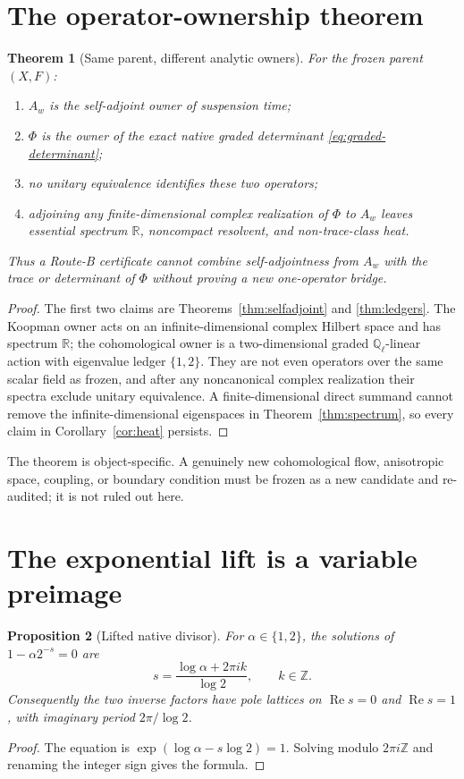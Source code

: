 \documentclass[11pt]{article}
\newtheorem{theorem}{Theorem}
\newtheorem{proposition}[theorem]{Proposition}
\theoremstyle{remark}\newtheorem{remark}[theorem]{Remark}
\newcommand{\R}{\mathbb R}
\newcommand{\Q}{\mathbb Q}
\newcommand{\Z}{\mathbb Z}
\begin{document}
\section{The operator-ownership theorem}

\begin{theorem}[Same parent, different analytic owners]\label{thm:owner}
For the frozen parent \((X,F)\):
\begin{enumerate}[label=(\roman*)]
\item \(A_w\) is the self-adjoint owner of suspension time;
\item \(\Phi\) is the owner of the exact native graded determinant
      \eqref{eq:graded-determinant};
\item no unitary equivalence identifies these two operators;
\item adjoining any finite-dimensional complex realization of \(\Phi\) to
      \(A_w\) leaves essential spectrum \(\R\), noncompact resolvent, and
      non-trace-class heat.
\end{enumerate}
Thus a Route-B certificate cannot combine self-adjointness from \(A_w\) with
the trace or determinant of \(\Phi\) without proving a new one-operator
bridge.
\end{theorem}
\begin{proof}
The first two claims are Theorems~\ref{thm:selfadjoint} and
\ref{thm:ledgers}.  The Koopman owner acts on an infinite-dimensional complex
Hilbert space and has spectrum \(\R\); the cohomological owner is a
two-dimensional graded \(\Q_\ell\)-linear action with eigenvalue ledger
\(\{1,2\}\).  They are not even operators over the same scalar field as
frozen, and after any noncanonical complex realization their spectra exclude
unitary equivalence.  A finite-dimensional direct summand cannot remove the
infinite-dimensional eigenspaces in Theorem~\ref{thm:spectrum}, so every
claim in Corollary~\ref{cor:heat} persists.
\end{proof}

The theorem is object-specific.  A genuinely new cohomological flow,
anisotropic space, coupling, or boundary condition must be frozen as a new
candidate and re-audited; it is not ruled out here.

\section{The exponential lift is a variable preimage}

\begin{proposition}[Lifted native divisor]\label{prop:lift}
For \(\alpha\in\{1,2\}\), the solutions of
\(1-\alpha2^{-s}=0\) are
\[
 s=\frac{\log\alpha+2\pi ik}{\log2},\qquad k\in\Z.
\]
Consequently the two inverse factors have pole lattices on
\(\operatorname{Re}s=0\) and \(\operatorname{Re}s=1\), with imaginary period
\(2\pi/\log2\).
\end{proposition}
\begin{proof}
The equation is \(\exp(\log\alpha-s\log2)=1\).  Solving modulo
\(2\pi i\Z\) and renaming the integer sign gives the formula.
\end{proof}
\end{document}
